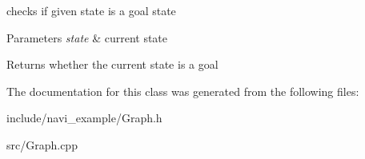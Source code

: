 checks if given state is a goal state 


\begin{DoxyParams}{\-Parameters}
{\em state} & current state \\
\hline
\end{DoxyParams}
\begin{DoxyReturn}{\-Returns}
whether the current state is a goal 
\end{DoxyReturn}


\-The documentation for this class was generated from the following files\-:\begin{DoxyCompactItemize}
\item 
include/navi\-\_\-example/\-Graph.\-h\item 
src/\-Graph.\-cpp\end{DoxyCompactItemize}
